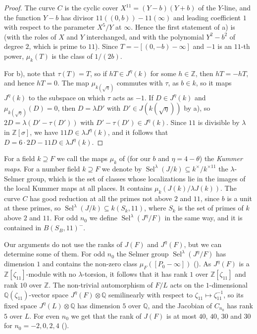 \documentclass[11pt,reqno]{amsart}
\DeclareMathOperator{\Sel}{Sel}
\newcommand{\Q}{\mathbb{Q}}
\newcommand{\Z}{\mathbb{Z}}
\theoremstyle{definition}
\numberwithin{equation}{section}
\begin{document}
\begin{proof}
The curve $C$ is the cyclic cover $X^{11}=(Y-b)(Y+b)$ of the $Y$-line, and the function $Y-b$ has divisor $11((0,b))-11(\infty)$ and leading coefficient $1$ with respect to the parameter $X^5/Y$ at $\infty$. Hence the first statement of a) is \cite[Theorem 2.3 and Section 3]{Schaefer98} (with the roles of $X$ and $Y$ interchanged, and with the polynomial $Y^2-b^2$ of degree $2$, which is prime to $11$). Since $T=-[(0,-b)-\infty]$ and $-1$ is an $11$-th power, $\mu_k(T)$ is the class of $1/(2b)$.

For b), note that $\tau(T)=T$, so if $hT\in J^\eta(k)$ for some $h\in\Z$, then $hT=-hT$, and hence $hT=0$. The map $\mu_{k(\sqrt\eta)}$ commutes with $\tau$, as $b\in k$, so it maps $J^\eta(k)$ to the subspace on which $\tau$ acts as $-1$. If $D\in J^\eta(k)$ and $\mu_{k(\sqrt\eta)}(D)=0$, then $D=\lambda D'$ with $D'\in J(k(\sqrt\eta))$ by a), so $2D=\lambda(D'-\tau(D'))$ with $D'-\tau(D')\in J^\eta(k)$. Since $11$ is divisible by $\lambda$ in $\Z[\sigma]$, we have $11D\in \lambda J^\eta(k)$, and it follows that $D=6\cdot 2D-11D\in\lambda J^\eta(k)$.
\end{proof}

For a field $k\supseteq F$ we call the maps $\mu_k$ of  (for our $b$ and $\eta=4-\theta$) the \textit{Kummer maps}. For a number field $k\supseteq F$ we denote by $\Sel^\lambda(J/k)\subseteq k^\times/k^{\times 11}$ the $\lambda$-Selmer group, which is the set of classes whose localizations lie in the images of the local Kummer maps at all places. It contains $\mu_k(J(k)/\lambda J(k))$. The curve $C$ has good reduction at all the primes not above $2$ and $11$, since $b$ is a unit at these primes, so $\Sel^\lambda(J/k)\subseteq k(S_k,11)$, where $S_k$ is the set of primes of $k$ above $2$ and $11$. For odd $n_0$ we define $\Sel^\lambda(J^\eta/F)$ in the same way, and it is contained in $B(S_B,11)^-$.

\begin{remark}\label{rem:ranks}
Our arguments do not use the ranks of $J(F)$ and $J^\eta(F)$, but we can determine some of them. For odd $n_0$ the Selmer group $\Sel^\lambda(J^\eta/F)$ has dimension $1$ and contains the non-zero class $\mu_F([P_0-\infty])$ (). As $J^\eta(F)$ is a $\Z[\zeta_{11}]$-module with no $\lambda$-torsion, it follows that it has rank $1$ over $\Z[\zeta_{11}]$ and rank $10$ over $\Z$. The non-trivial automorphism of $F/L$ acts on the $1$-dimensional $\Q(\zeta_{11})$-vector space $J^\eta(F)\otimes\Q$ semilinearly with respect to $\zeta_{11}\mapsto\zeta_{11}^{-1}$, so its fixed space $J^\eta(L)\otimes\Q$ has dimension $5$ over $\Q$, and the Jacobian of $C_{n_0}$ has rank $5$ over $L$. For even $n_0$ we get that the rank of $J(F)$ is at most $40$, $40$, $30$ and $30$ for $n_0=-2,0,2,4$ ().
\end{remark}
\end{document}
